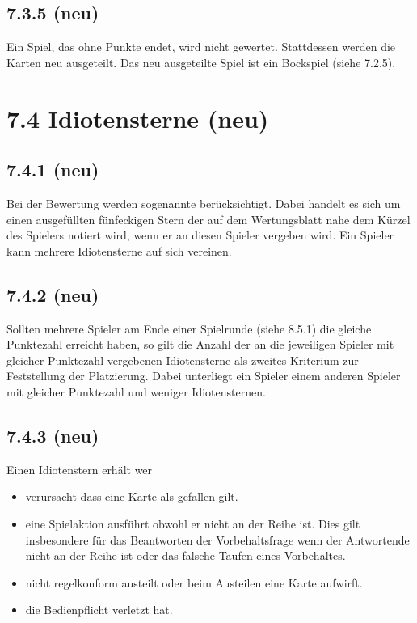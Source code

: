 \subsection*{7.3.5 (neu)}

Ein Spiel, das ohne Punkte endet, wird nicht gewertet. Stattdessen
werden die Karten neu ausgeteilt. Das neu ausgeteilte Spiel ist ein
Bockspiel (siehe 7.2.5).

\section*{7.4 Idiotensterne (neu)}

\subsection*{7.4.1 (neu)}

Bei der Bewertung werden sogenannte  berücksichtigt. Dabei
handelt es sich um einen ausgefüllten fünfeckigen Stern der auf dem
Wertungsblatt nahe dem Kürzel des Spielers notiert wird, wenn er an diesen
Spieler vergeben wird. Ein Spieler kann mehrere Idiotensterne auf sich vereinen.

\subsection*{7.4.2 (neu)}

Sollten mehrere Spieler am Ende einer Spielrunde (siehe 8.5.1) die gleiche
Punktezahl erreicht haben, so gilt die Anzahl der an die jeweiligen Spieler mit
gleicher Punktezahl vergebenen Idiotensterne als zweites Kriterium zur
Feststellung der Platzierung. Dabei unterliegt ein Spieler einem anderen Spieler
mit gleicher Punktezahl und weniger Idiotensternen.

\subsection*{7.4.3 (neu)}

Einen Idiotenstern erhält wer
\begin{itemize}
    \item{verursacht dass eine Karte als gefallen gilt.}
    \item{eine Spielaktion ausführt obwohl er nicht an der Reihe ist. Dies gilt
        insbesondere für das Beantworten der Vorbehaltsfrage wenn der
        Antwortende nicht an der Reihe ist oder das falsche Taufen eines
        Vorbehaltes.}
    \item{nicht regelkonform austeilt oder beim Austeilen eine Karte aufwirft.}
    \item{die Bedienpflicht verletzt hat.}
\end{itemize}

